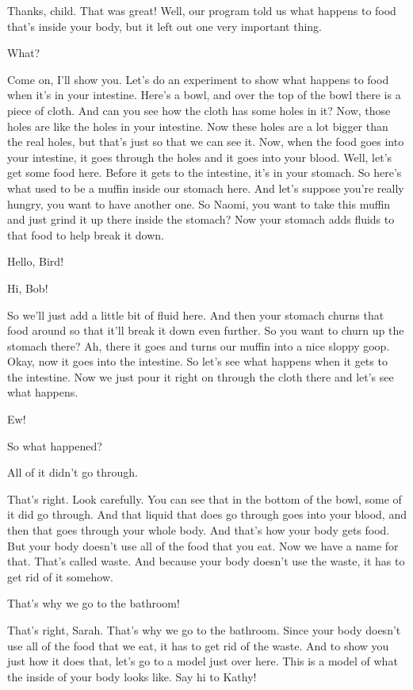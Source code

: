 Thanks, child. That was great! Well, our program told us what happens to food that's inside your body, but it left out one very important thing.

What?

Come on, I'll show you. Let's do an experiment to show what happens to food when it's in your intestine. Here's a bowl, and over the top of the bowl there is a piece of cloth. And can you see how the cloth has some holes in it? Now, those holes are like the holes in your intestine. Now these holes are a lot bigger than the real holes, but that's just so that we can see it. Now, when the food goes into your intestine, it goes through the holes and it goes into your blood. Well, let's get some food here. Before it gets to the intestine, it's in your stomach. So here's what used to be a muffin inside our stomach here. And let's suppose you're really hungry, you want to have another one. So Naomi, you want to take this muffin and just grind it up there inside the stomach? Now your stomach adds fluids to that food to help break it down.

Hello, Bird!

Hi, Bob!

So we'll just add a little bit of fluid here. And then your stomach churns that food around so that it'll break it down even further. So you want to churn up the stomach there? Ah, there it goes and turns our muffin into a nice sloppy goop. Okay, now it goes into the intestine. So let's see what happens when it gets to the intestine. Now we just pour it right on through the cloth there and let's see what happens.

Ew!

So what happened?

All of it didn't go through.

That's right. Look carefully. You can see that in the bottom of the bowl, some of it did go through. And that liquid that does go through goes into your blood, and then that goes through your whole body. And that's how your body gets food. But your body doesn't use all of the food that you eat. Now we have a name for that. That's called waste. And because your body doesn't use the waste, it has to get rid of it somehow.

That's why we go to the bathroom!

That's right, Sarah. That's why we go to the bathroom. Since your body doesn't use all of the food that we eat, it has to get rid of the waste. And to show you just how it does that, let's go to a model just over here. This is a model of what the inside of your body looks like. Say hi to Kathy!

